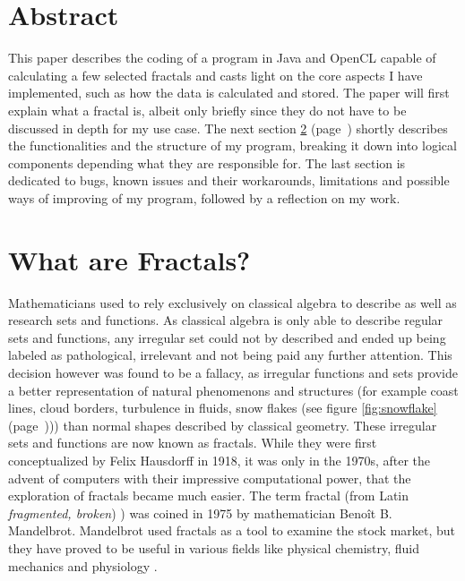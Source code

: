 \documentclass[10pt,a4paper,titlepage]{article}
\begin{document}
	
	\begin{titlepage}
		\null
		\newpage
	\end{titlepage}
	
	\tableofcontents
	\listoffigures
	\clearpage
	\let\oldref\ref
	\renewcommand{\ref}[1]{\oldref{#1} (page~\pageref{#1})}
	
	\section{Abstract}
	This paper describes the coding of a program in Java and OpenCL capable of calculating a few selected fractals and casts light on the core aspects I have implemented, such as how the data is calculated and stored. The paper will first explain what a fractal is, albeit only briefly since they do not have to be discussed in depth for my use case. The next section \ref{sec:fractals} shortly describes the functionalities and the structure of my program, breaking it down into logical components depending what they are responsible for. The last section is dedicated to bugs, known issues and their workarounds, limitations and possible ways of improving of my program, followed by a reflection on my work.
	\section{What are Fractals?}\label{sec:fractals}
	Mathematicians used to rely exclusively on classical algebra to describe as well as research sets and functions. As classical algebra is only able to describe regular sets and functions, any irregular set could not by described and ended up being labeled as pathological, irrelevant and not being paid any further attention. This decision however was found to be a fallacy, as irregular functions and sets provide a better representation of natural phenomenons and structures (for example coast lines, cloud borders, turbulence in fluids, snow flakes (see figure \ref{fig:snowflake})) than normal shapes described by classical geometry. These irregular sets and functions are now known as fractals. 
	While they were first conceptualized by Felix Hausdorff in 1918, it was only in the 1970s, after the advent of computers with their impressive computational power, that the exploration of fractals became much easier. The term fractal (from Latin \emph{fragmented, broken}) ) was coined in 1975 by mathematician Benoît B. Mandelbrot. Mandelbrot used fractals as a tool to examine the stock market, but they have proved to be useful in various fields like physical chemistry, fluid mechanics and physiology \cite{FalconerKennethJ1993FG:m, britannica}.
\end{document}

